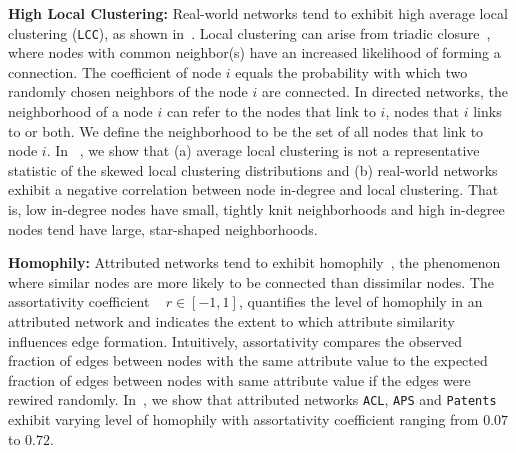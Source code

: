 \textbf{High Local Clustering:}
Real-world networks tend to exhibit high average local clustering
(\texttt{LCC}), as shown in~. Local
clustering can arise from triadic closure~\cite{simmel1950sociology,
newman2001clustering}, where nodes with common neighbor(s) have an increased
likelihood of forming a connection.
The coefficient of node $i$ equals the probability with which two randomly chosen
neighbors of the node $i$ are connected. In directed networks, the neighborhood
of a node $i$ can refer to the nodes that link to $i$, nodes that
$i$ links to or both. We define the neighborhood to be the set
of all nodes that link to node $i$. In ~, we show that (a) average local clustering is not a
representative statistic of the skewed local clustering distributions and (b) real-world networks
exhibit a negative correlation between node in-degree and local clustering.
That is, low in-degree nodes have small, tightly knit neighborhoods
and high in-degree nodes tend have large, star-shaped neighborhoods.


\textbf{Homophily:}
Attributed networks tend to exhibit homophily~\cite{mcpherson2001birds}, the
phenomenon where similar nodes are more likely to be connected than dissimilar
nodes. The assortativity coefficient ~\cite{newman2002assortative} $r \in [-1,
1]$, quantifies the level of homophily in an attributed network and indicates
the extent to which attribute similarity influences edge formation. Intuitively,
assortativity compares the observed fraction of edges between nodes with the same attribute
value to the expected fraction of edges between nodes with same attribute value
if the edges were rewired randomly. In~, we show that
attributed networks \texttt{ACL}, \texttt{APS} and \texttt{Patents} exhibit
varying level of homophily with assortativity coefficient ranging from $0.07$ to
$0.72$.

